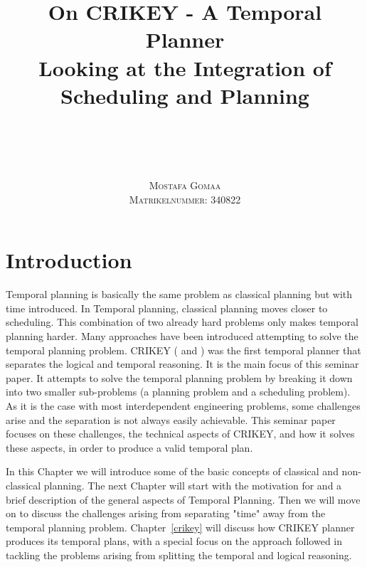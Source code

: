 \documentclass
[a4paper
,english
,parskip=half
,bibliography=totoc
]{scrreprt}
\title{
    On CRIKEY - A Temporal Planner\\ 
    Looking at the Integration of\\
    Scheduling and Planning
}
\author{
    \\
    \\
    \\
    \\
    \scshape Mostafa Gomaa\\
    \scshape \small Matrikelnummer: 340822
}
\date{}
\begin{document}
\pagestyle{useheadings}
\maketitle
\tableofcontents
\cleardoublepage
\pagestyle{scrheadings}




\chapter{Introduction}

Temporal planning is basically the same problem as classical planning but with time introduced. In Temporal planning, classical planning moves closer to scheduling. This combination of two already hard problems only makes temporal planning harder. Many approaches have been introduced attempting to solve the temporal planning problem.
CRIKEY (\citet{crikey_1} and \citet{crikey_2}) was the first temporal planner that separates the logical and temporal reasoning. It is the main focus of this seminar paper. It attempts to solve the temporal planning problem by breaking it down into two smaller sub-problems (a planning problem and a scheduling problem). As it is the case with most interdependent engineering problems, some challenges arise and the separation is not always easily achievable. This seminar paper focuses on these challenges, the technical aspects of CRIKEY, and how it solves these aspects, in order to produce a valid temporal plan.

In this Chapter we will introduce some of the basic concepts of classical and non-classical planning. The next Chapter will start with the motivation for and a brief description of the general aspects of Temporal Planning. Then we will move on to discuss the challenges arising from separating "time" away from the temporal planning problem. Chapter~\ref{crikey} will discuss how CRIKEY planner produces its temporal plans, with a special focus on the approach followed in tackling the problems arising from splitting the temporal and logical reasoning.
\end{document}
